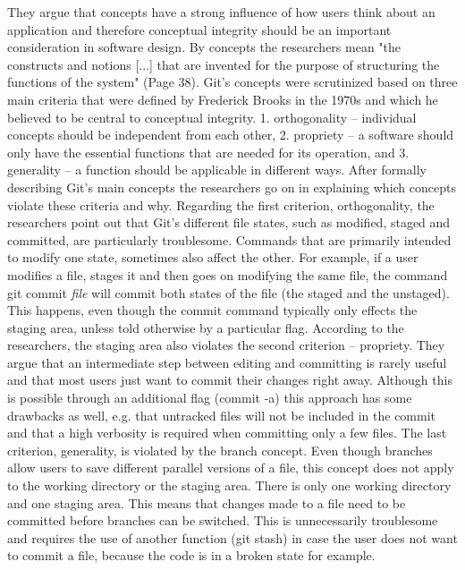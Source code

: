 \setlength{\parskip}{0em}
They argue that concepts have a strong influence of how users think about an application and therefore conceptual integrity should be an important consideration in software design. By concepts the researchers mean "the constructs and notions [...] that are invented for the purpose of structuring the functions of the system" (Page 38). Git's concepts were scrutinized based on three main criteria that were defined by Frederick Brooks in the 1970s \cite{brooks_mythical_1995} and which he believed to be central to conceptual integrity. 1. orthogonality – individual concepts should be independent from each other, 2. propriety – a software should only have the essential functions that are needed for its operation, and 3. generality – a function should be applicable in different ways. After formally describing Git's main concepts the researchers go on in explaining which concepts violate these criteria and why. Regarding the first criterion, orthogonality, the researchers point out that Git's different file states, such as modified, staged and committed, are particularly troublesome. Commands that are primarily intended to modify one state, sometimes also affect the other. For example, if a user modifies a file, stages it and then goes on modifying the same file, the command git commit \textit{file} will commit both states of the file (the staged and the unstaged). This happens, even though the commit command typically only effects the staging area, unless told otherwise by a particular flag. 
According to the researchers, the staging area also violates the second criterion – propriety. They argue that an intermediate step between editing and committing is rarely useful and that most users just want to commit their changes right away. Although this is possible through an additional flag (commit -a) this approach has some drawbacks as well, e.g. that untracked files will not be included in the commit and that a high verbosity is required when committing only a few files. 
The last criterion, generality, is violated by the branch concept. Even though branches allow users to save different parallel versions of a file, this concept does not apply to the working directory or the staging area. There is only one working directory and one staging area. This means that changes made to a file need to be committed before branches can be switched. This is unnecessarily troublesome and requires the use of another function (git stash) in case the user does not want to commit a file, because the code is in a broken state for example.

